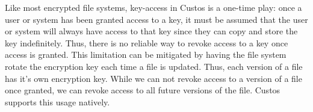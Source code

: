 Like most encrypted file systems, key-access in Custos is a one-time
play: once a user or system has been granted access to a key, it must
be assumed that the user or system will always have access to that key
since they can copy and store the key indefinitely. Thus, there is no
reliable way to revoke access to a key once access is granted. This
limitation can be mitigated by having the file system rotate the
encryption key each time a file is updated. Thus, each version of a
file has it's own encryption key. While we can not revoke access to a
version of a file once granted, we can revoke access to all future
versions of the file. Custos supports this usage natively.
